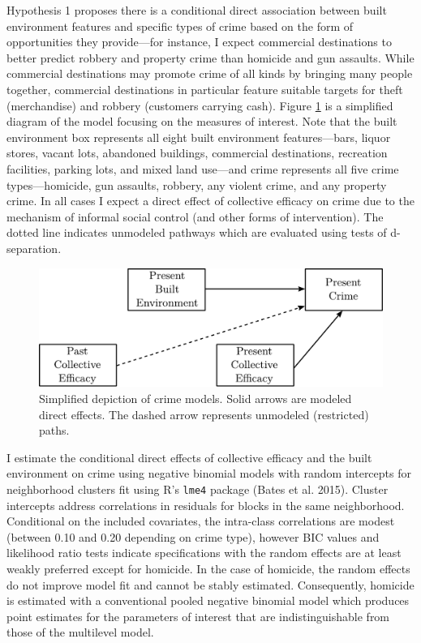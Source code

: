 \documentclass [11pt, proquest] {uwthesis}[2015/03/03]
\begin{document}
Hypothesis 1 proposes there is a conditional direct association between built environment features and specific types of crime based on the form of opportunities they provide---for instance, I expect commercial destinations to better predict robbery and property crime than homicide and gun assaults. While commercial destinations may promote crime of all kinds by bringing many people together, commercial destinations in particular feature suitable targets for theft (merchandise) and robbery (customers carrying cash). Figure \ref{fig:directmodels} is a simplified diagram of the model focusing on the measures of interest. Note that the built environment box represents all eight built environment features---bars, liquor stores, vacant lots, abandoned buildings, commercial destinations, recreation facilities, parking lots, and mixed land use---and crime represents all five crime types---homicide, gun assaults, robbery, any violent crime, and any property crime. In all cases I expect a direct effect of collective efficacy on crime due to the mechanism of informal social control (and other forms of intervention). The dotted line indicates unmodeled pathways which are evaluated using tests of d-separation.
\begin{figure}
\includegraphics[width=1\linewidth]{./figure/ch2/direct_models} \caption{Simplified depiction of crime models. Solid arrows are modeled direct effects. The dashed arrow represents unmodeled (restricted) paths.}\label{fig:directmodels}
\end{figure}
I estimate the conditional direct effects of collective efficacy and the built environment on crime using negative binomial models with random intercepts for neighborhood clusters fit using R's \texttt{lme4} package (Bates et al. 2015). Cluster intercepts address correlations in residuals for blocks in the same neighborhood. Conditional on the included covariates, the intra-class correlations are modest (between 0.10 and 0.20 depending on crime type), however BIC values and likelihood ratio tests indicate specifications with the random effects are at least weakly preferred except for homicide. In the case of homicide, the random effects do not improve model fit and cannot be stably estimated. Consequently, homicide is estimated with a conventional pooled negative binomial model which produces point estimates for the parameters of interest that are indistinguishable from those of the multilevel model.
\end{document}
